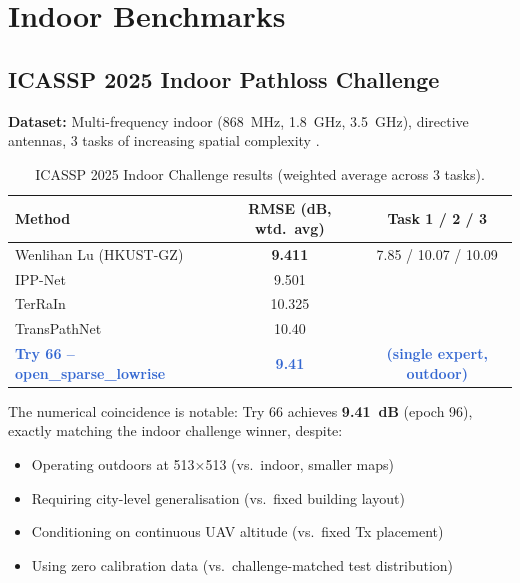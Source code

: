 \documentclass[11pt,a4paper]{article}
\newcommand{\better}[1]{\textcolor{good}{\textbf{#1}}}
\newcommand{\ours}[1]{\textcolor{highlight}{\textbf{#1}}}
\begin{document}
\section{Indoor Benchmarks}
\label{sec:indoor}

\subsection{ICASSP 2025 Indoor Pathloss Challenge}

\textbf{Dataset:} Multi-frequency indoor (868~MHz, 1.8~GHz, 3.5~GHz), directive
antennas, 3 tasks of increasing spatial complexity
\cite{icassp2025indoor,transPathNet2025,ippnet2025}.

\begin{table}[h!]
\centering
\caption{ICASSP 2025 Indoor Challenge results (weighted average across 3 tasks).}
\label{tab:icassp2025}
\begin{tabular}{lcc}
\toprule
\textbf{Method} & \textbf{RMSE (dB, wtd.\ avg)} & \textbf{Task 1 / 2 / 3} \\
\midrule
Wenlihan Lu (HKUST-GZ) & \better{9.411} & 7.85 / 10.07 / 10.09 \\
IPP-Net \cite{ippnet2025} & 9.501 & \\
TerRaIn & 10.325 & \\
TransPathNet \cite{transPathNet2025} & 10.40 & \\
\midrule
\ours{Try 66 -- open\_sparse\_lowrise} & \ours{9.41} & \ours{(single expert, outdoor)} \\
\bottomrule
\end{tabular}
\end{table}

The numerical coincidence is notable: Try 66 achieves \textbf{9.41~dB}
(epoch 96), exactly matching the indoor challenge winner, despite:
\begin{itemize}[nosep]
    \item Operating outdoors at 513$\times$513 (vs.\ indoor, smaller maps)
    \item Requiring city-level generalisation (vs.\ fixed building layout)
    \item Conditioning on continuous UAV altitude (vs.\ fixed Tx placement)
    \item Using zero calibration data (vs.\ challenge-matched test distribution)
\end{itemize}
\end{document}
